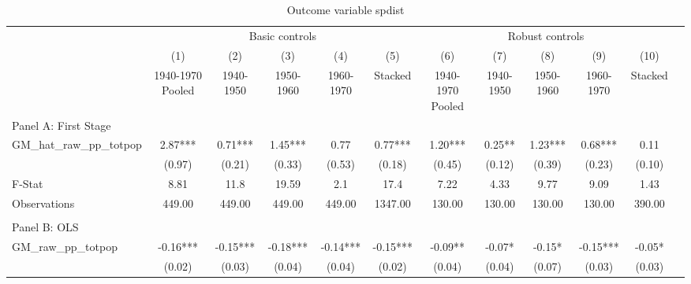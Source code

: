  \begin{table}[htbp]\centering {} \begin{threeparttable} \caption{Outcome variable spdist} \begin{tabular}{l*{11}{c}} \toprule
          &\multicolumn{5}{c}{Basic controls}                                   &\multicolumn{5}{c}{Robust controls}                                  \\\cmidrule(lr){2-6}\cmidrule(lr){7-11}
          &\multicolumn{1}{c}{(1)}&\multicolumn{1}{c}{(2)}&\multicolumn{1}{c}{(3)}&\multicolumn{1}{c}{(4)}&\multicolumn{1}{c}{(5)}&\multicolumn{1}{c}{(6)}&\multicolumn{1}{c}{(7)}&\multicolumn{1}{c}{(8)}&\multicolumn{1}{c}{(9)}&\multicolumn{1}{c}{(10)}\\
          &\multicolumn{1}{c}{1940-1970 Pooled}&\multicolumn{1}{c}{1940-1950}&\multicolumn{1}{c}{1950-1960}&\multicolumn{1}{c}{1960-1970}&\multicolumn{1}{c}{Stacked}&\multicolumn{1}{c}{1940-1970 Pooled}&\multicolumn{1}{c}{1940-1950}&\multicolumn{1}{c}{1950-1960}&\multicolumn{1}{c}{1960-1970}&\multicolumn{1}{c}{Stacked}\\
\cmidrule(lr){1-11}
\multicolumn{10}{l}{Panel A: First Stage}\\
\cmidrule(lr){1-11}
GM\_hat\_raw\_pp\_totpop&      2.87***&      0.71***&      1.45***&      0.77   &      0.77***&      1.20***&      0.25** &      1.23***&      0.68***&      0.11   \\
          &    (0.97)   &    (0.21)   &    (0.33)   &    (0.53)   &    (0.18)   &    (0.45)   &    (0.12)   &    (0.39)   &    (0.23)   &    (0.10)   \\
\midrule
F-Stat    &      8.81   &      11.8   &     19.59   &       2.1   &      17.4   &      7.22   &      4.33   &      9.77   &      9.09   &      1.43   \\
Observations&    449.00   &    449.00   &    449.00   &    449.00   &   1347.00   &    130.00   &    130.00   &    130.00   &    130.00   &    390.00   \\
\cmidrule[\heavyrulewidth](lr){1-11} \\ \cmidrule[\heavyrulewidth](lr){1-11}
\multicolumn{10}{l}{Panel B: OLS}\\
\cmidrule(lr){1-11}
GM\_raw\_pp\_totpop&     -0.16***&     -0.15***&     -0.18***&     -0.14***&     -0.15***&     -0.09** &     -0.07*  &     -0.15*  &     -0.15***&     -0.05*  \\
          &    (0.02)   &    (0.03)   &    (0.04)   &    (0.04)   &    (0.02)   &    (0.04)   &    (0.04)   &    (0.07)   &    (0.03)   &    (0.03)   \\

\end{tabular}
\end{threeparttable}
\end{table}
